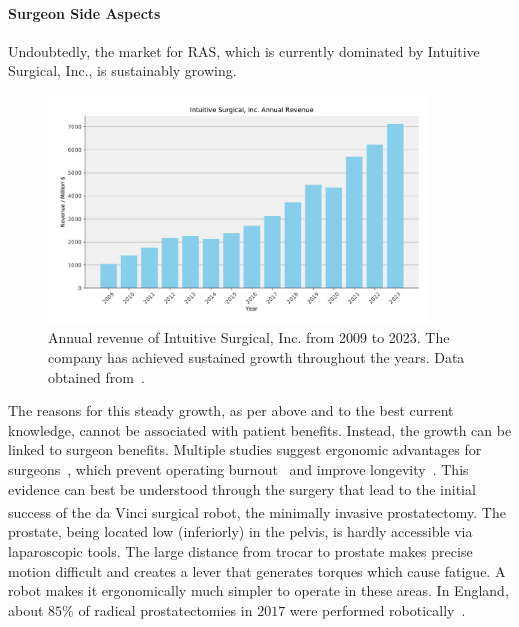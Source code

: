 \paragraph{Surgeon Side Aspects} Undoubtedly, the market for RAS, which is currently dominated by Intuitive Surgical, Inc., is sustainably growing. 

\begin{figure}[tb]
    \centering
    \includegraphics[width=0.9\textwidth]{introduction/fig/intuitive_revenue.pdf}
    \caption{Annual revenue of Intuitive Surgical, Inc. from 2009 to 2023. The company has achieved sustained growth throughout the years. Data obtained from~\cite{intuitiverevenue}.}
    \label{in:fig:intuitive_revenue}
\end{figure}

The reasons for this steady growth, as per above and to the best current knowledge, cannot be associated with patient benefits. Instead, the growth can be linked to surgeon benefits. Multiple studies suggest ergonomic advantages for surgeons~\cite{monfared2022comparison, zarate2019ergonomic}, which prevent operating burnout~\cite{wells2019operating} and improve longevity~\cite{stucky2018surgeon}. This evidence can best be understood through the surgery that lead to the initial success of the da Vinci\textsuperscript{\textregistered} surgical robot, the minimally invasive prostatectomy. The prostate, being located low (inferiorly) in the pelvis, is hardly accessible via laparoscopic tools. The large distance from trocar to prostate makes precise motion difficult and creates a lever that generates torques which cause fatigue. A robot makes it ergonomically much simpler to operate in these areas. In England, about $85\%$ of radical prostatectomies in $2017$ were performed robotically~\cite{maynou2021patterns}.


